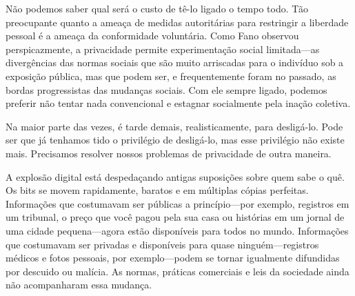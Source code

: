 \documentclass{book}
\begin{document}
Não podemos saber qual será o custo de tê-lo ligado o tempo todo. Tão
preocupante quanto a ameaça de medidas autoritárias para restringir a liberdade
pessoal é a ameaça da conformidade voluntária. Como Fano observou
perspicazmente, a privacidade permite experimentação social limitada---as
divergências das normas sociais que são muito arriscadas para o indivíduo sob a
exposição pública, mas que podem ser, e frequentemente foram no passado, as
bordas progressistas das mudanças sociais. Com ele sempre ligado, podemos
preferir não tentar nada convencional e estagnar socialmente pela inação
coletiva.

Na maior parte das vezes, é tarde demais, realisticamente, para desligá-lo.
Pode ser que já tenhamos tido o privilégio de desligá-lo, mas esse privilégio
não existe mais. Precisamos resolver nossos problemas de privacidade de outra
maneira.

A explosão digital está despedaçando antigas suposições sobre quem sabe o quê.
Os bits se movem rapidamente, baratos e em múltiplas cópias perfeitas.
Informações que costumavam ser públicas a princípio---por exemplo, registros em
um tribunal, o preço que você pagou pela sua casa ou histórias em um jornal de
uma cidade pequena---agora estão disponíveis para todos no mundo. Informações
que costumavam ser privadas e disponíveis para quase ninguém---registros
médicos e fotos pessoais, por exemplo---podem se tornar igualmente difundidas
por descuido ou malícia. As normas, práticas comerciais e leis da sociedade
ainda não acompanharam essa mudança.
\end{document}

